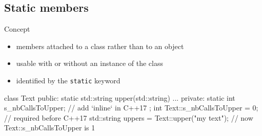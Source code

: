 \subsection[static]{Static members}

\begin{frame}[fragile]
  \begin{block}{Concept}
    \begin{itemize}
    \item members attached to a class rather than to an object
    \item usable with or without an instance of the class
    \item identified by the \texttt{static} keyword
    \end{itemize}
  \end{block}
  \begin{cppcode}
    class Text {
    public:
      static std::string upper(std::string) {...}
    private:
      static int s_nbCallsToUpper; // add `inline` in C++17
    };
    int Text::s_nbCallsToUpper = 0; // required before C++17
    std::string uppers = Text::upper("my text");
    // now Text::s_nbCallsToUpper is 1
  \end{cppcode}
\end{frame}
